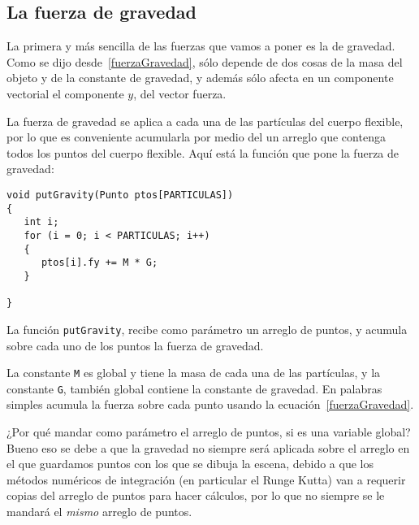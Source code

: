 \subsection{La fuerza de gravedad}
La primera y más sencilla de las fuerzas que vamos a poner es la de gravedad. Como se dijo desde~\ref{fuerzaGravedad}, sólo depende de dos cosas de la masa del objeto y de la constante de gravedad, y además sólo afecta en un componente vectorial el componente $y$, del vector fuerza.

La fuerza de gravedad se aplica a cada una de las partículas del cuerpo flexible, por lo que es conveniente acumularla por medio del un arreglo que contenga todos los puntos del cuerpo flexible. Aquí está la función que pone la fuerza de gravedad:
\begin{verbatim}
void putGravity(Punto ptos[PARTICULAS])
{
   int i;
   for (i = 0; i < PARTICULAS; i++)
   {
      ptos[i].fy += M * G;
   }

}
\end{verbatim} 
La función \verb|putGravity|, recibe como parámetro un arreglo de puntos, y acumula sobre cada uno de los puntos la fuerza de gravedad.

La constante \verb|M| es global y tiene la masa de cada una de las partículas, y la constante \verb|G|, también global contiene la constante de gravedad. En palabras simples acumula la fuerza sobre cada punto usando la ecuación~\ref{fuerzaGravedad}.

¿Por qué mandar como parámetro el arreglo de puntos, si es una variable global? Bueno eso se debe a que la gravedad no siempre será aplicada sobre el arreglo en el que guardamos puntos con los que se dibuja la escena, debido a que los métodos numéricos de integración (en particular el Runge Kutta) van a requerir copias del arreglo de puntos para hacer cálculos, por lo que no siempre se le mandará el \emph{mismo} arreglo de puntos.

